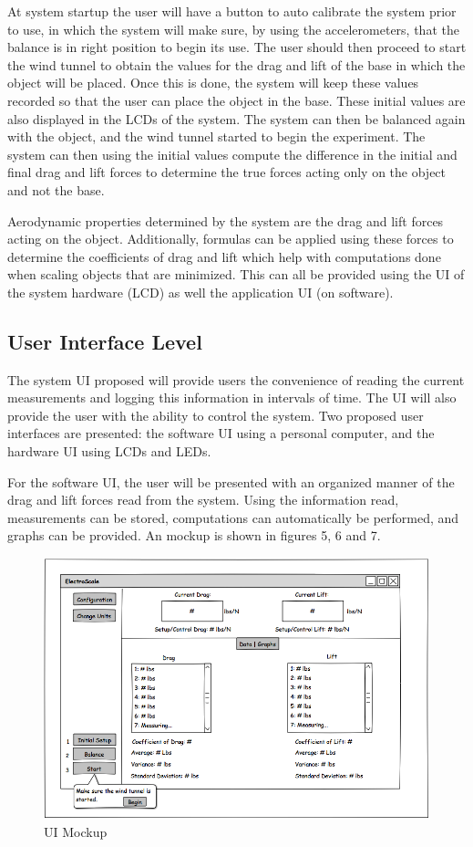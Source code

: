 		At system startup the user will have a button to auto calibrate the system prior to use, in which the system will make sure, by using the accelerometers, that the balance is in right position to begin its use. The user should then proceed to start the wind tunnel to obtain the values for the drag and lift of the base in which the object will be placed. Once this is done, the system will keep these values recorded so that the user can place the object in the base. These initial values are also displayed in the LCDs of the system. The system can then be balanced again with the object, and the wind tunnel started to begin the experiment. The system can then using the initial values compute the difference in the initial and final drag and lift forces to determine the true forces acting only on the object and not the base. 

		Aerodynamic properties determined by the system are the drag and lift forces acting on the object. Additionally, formulas can be applied using these forces to determine the coefficients of drag and lift which help with computations done when scaling objects that are minimized. This can all be provided using the UI of the system hardware (LCD) as well the application UI (on software). 


	\subsection{User Interface Level}

		The system UI proposed will provide users the convenience of reading the current measurements and logging this information in intervals of time. The UI will also provide the user with the ability to control the system. Two proposed user interfaces are presented: the software UI using a personal computer, and the hardware UI using LCDs and LEDs.

		For the software UI, the user will be presented with an organized manner of the drag and lift forces read from the system. Using the information read, measurements can be stored, computations can automatically be performed, and graphs can be provided. An mockup is shown in figures 5, 6 and 7.

		\begin{figure}[H]
			\centering
				\includegraphics[scale=0.40]{img/UI-PC}
			\caption{UI Mockup}
		\end{figure}

